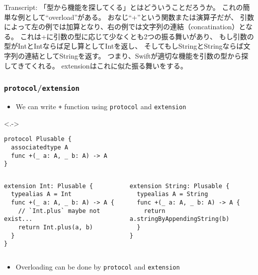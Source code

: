 \begin{frame}[fragile]
\begin{notes}
    \item Transcript:
    「型から機能を探してくる」とはどういうことだろうか。
    これの簡単な例として``overload''がある。
    おなじ``+''という関数または演算子だが、
    引数によって左の例では加算となり、右の例では文字列の連結（concatination）となる。
    これは+に引数の型に応じて少なくとも2つの振る舞いがあり、
    もし引数の型がIntとIntならば足し算としてIntを返し、
    そしてもしStringとStringならば文字列の連結としてStringを返す。
    つまり、Swiftが適切な機能を引数の型から探してきてくれる。
    extensionはこれに似た振る舞いをする。
  \end{notes}
\end{frame}

\begin{frame}[fragile]
  \frametitle{\texttt{protocol}/\texttt{extension}}

  \begin{itemize}
    \item<+-> We can write \lstinline|+| function using
    \lstinline|protocol| and \lstinline|extension|
  \end{itemize}
  
  \begin{uncoverenv}<.->
\begin{lstlisting}[style=swift]
protocol Plusable {
  associatedtype A
  func +(_ a: A, _ b: A) -> A
}    
\end{lstlisting}

    \begin{columns}
      \begin{column}{0.5\textwidth}
\begin{lstlisting}[style=swift]
extension Int: Plusable {
  typealias A = Int
  func +(_ a: A, _ b: A) -> A {
    // `Int.plus` maybe not exist...
    return Int.plus(a, b)
  }
}
\end{lstlisting}
    \end{column}
    \begin{column}{0.5\textwidth}
\begin{lstlisting}[style=swift]
extension String: Plusable {
  typealias A = String
  func +(_ a: A, _ b: A) -> A {
    return a.stringByAppendingString(b)
  }
}
\end{lstlisting}
      \end{column}
    \end{columns}
  \end{uncoverenv}

  \begin{itemize}
    \item<+-> Overloading can be done by \lstinline|protocol| and \lstinline|extension|
  \end{itemize}


\end{frame}
